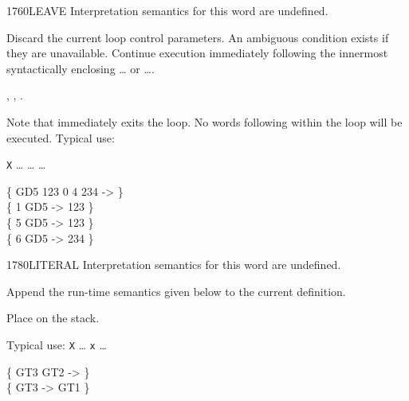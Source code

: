 \begin{worddef}{1760}{LEAVE}
\interpret
	Interpretation semantics for this word are undefined.

\execute
	\stack{}{}

	Discard the current loop control parameters. An ambiguous condition
	exists if they are unavailable. Continue execution immediately
	following the innermost syntactically enclosing
	\ldots{} or \ldots{}.

\see {},
	,
	.

	\begin{defer}
	\rationale %
		Note that  immediately exits the loop. No words
		following  within the loop will be executed.
		Typical use:

		\tab \word{:} \texttt{X} {\ldots} 
			{\ldots} 
				{\ldots} 
		\word{;}

	\testing
		\{ \word{:} GD5 123  0 
			 4    234   
		\word{;} -> \} \\
		\{ 1 GD5 -> 123 \} \\
		\{ 5 GD5 -> 123 \} \\
		\{ 6 GD5 -> 234 \}
	\end{defer}
\end{worddef}


\begin{worddef}{1780}{LITERAL}
\interpret
	Interpretation semantics for this word are undefined.

\compile
	\stack{x}{}

	Append the run-time semantics given below to the current definition.

\runtime
	\stack{}{x}

	Place  on the stack.

	\begin{defer}
	\rationale %
		Typical use:
			\word{:} \texttt{X} {\ldots}
				\word{[} \texttt{x} \word{]} \word{LITERAL}
			{\ldots} \word{;}

	\testing
		\{ \word{:} GT3 GT2  \word{;} -> \} \\
		\{ GT3 ->  GT1 \}
	\end{defer}
\end{worddef}



